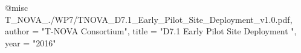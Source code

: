 @misc{ T_NOVA_./WP7/TNOVA_D7.1_Early_Pilot_Site_Deployment_v1.0.pdf,
       author = "{T-NOVA Consortium}",
       title = "D7.1 Early Pilot Site Deployment ",
       year = "2016" }
